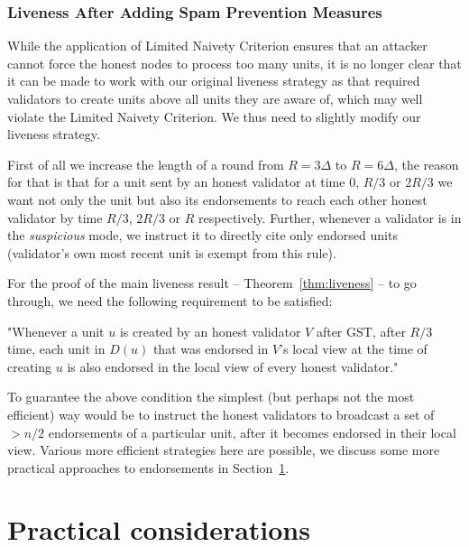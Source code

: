 \documentclass[12pt, fleqn]{article}
\newcommand{\gst}{\mathrm{GST}}
\begin{document}
\subsubsection{Liveness After Adding Spam Prevention Measures}\label{sec:dynamicrounds}

While the application of Limited Naivety Criterion ensures that an attacker cannot force the honest nodes to process too many units, it is no longer clear that it can be made to work with our original liveness strategy as that required validators to create units above all units they are aware of, which may well violate the Limited Naivety Criterion. We thus need to slightly modify our liveness strategy.

First of all we increase the length of a round from $R=3\Delta$ to $R=6\Delta$, the reason for that is that for a unit sent by an honest validator at time $0$, $R/3$ or $2R/3$ we want not only the unit but also its endorsements to reach each other honest validator by time $R/3$, $2R/3$ or $R$ respectively.
%
Further, whenever a validator is in the {\it suspicious} mode, we instruct it to directly cite only endorsed units (validator's own most recent unit is exempt from this rule).

For the proof of the main liveness result -- Theorem~\ref{thm:liveness} -- to go through, we need the following requirement to be satisfied: 

 "Whenever a unit $u$ is created by an honest validator $V$ after $\gst$, after $R/3$ time, each unit in $D(u)$ that was endorsed in $V$'s local view at the time of creating $u$ is also endorsed in the local view of every honest validator."

To guarantee the above condition the simplest (but perhaps not the most efficient) way would be to instruct the honest validators to broadcast a set of $>n/2$ endorsements of a particular unit, after it becomes endorsed in their local view.
%
Various more efficient strategies here are possible, we discuss some more practical approaches to endorsements in Section~\ref{sec:practical}.


\section{Practical considerations}\label{sec:practical}
\end{document}
